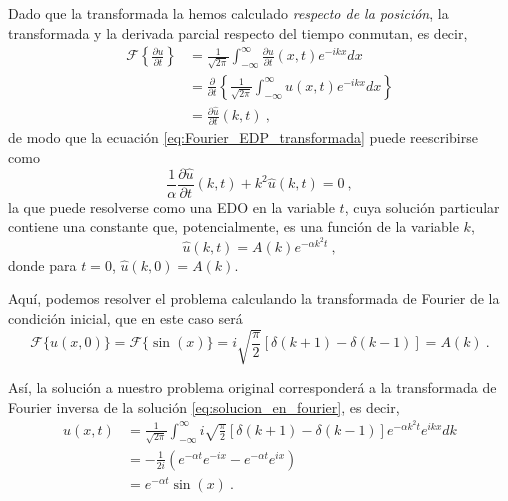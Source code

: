 \begin{ejemplo}
    Dado que la transformada la hemos calculado \emph{respecto de la posición}, la transformada y la derivada parcial respecto del tiempo conmutan, es decir,
    \begin{align}
        \mathcal{F} \left\{ \frac{\partial u}{\partial t} \right\} & = \frac{1}{\sqrt{2\pi}} \int_{-\infty}^\infty \frac{\partial u}{\partial t} (x,t) e^{-ikx} dx \nonumber \\
        & = \frac{\partial }{\partial t} \left\{ \frac{1}{\sqrt{2\pi}} \int_{-\infty}^\infty u(x,t) e^{-ikx} dx  \right\} \nonumber \\
        & = \frac{\partial \hat{u}}{\partial t}(k,t) \ ,
    \end{align}
    de modo que la ecuación \eqref{eq:Fourier_EDP_transformada} puede reescribirse como
    \begin{equation} \label{eq:EDP_fourier_reducida}
        \frac{1}{\alpha} \frac{\partial \hat{u}}{\partial t}(k,t) + k^2 \hat{u}(k,t) = 0 \ ,
    \end{equation}
    la que puede resolverse como una EDO en la variable $t$, cuya solución particular contiene una constante que, potencialmente, es una función de la variable $k$,
    \begin{equation} \label{eq:solucion_en_fourier}
        \hat{u}(k,t) = A(k) e^{-\alpha k^2 t} \ ,
    \end{equation}
    donde para $t=0$, $\hat{u}(k,0) = A(k)$.

    Aquí, podemos resolver el problema calculando la transformada de Fourier de la condición inicial, que en este caso será
    \begin{equation}
        \mathcal{F}\{u(x,0)\} =  \mathcal{F}\{\sin(x)\} = i \sqrt{\frac{\pi}{2}} [\delta(k+1) - \delta(k-1)] = A(k) \ .
    \end{equation}
    
    Así, la solución a nuestro problema original corresponderá a la transformada de Fourier inversa de la solución \eqref{eq:solucion_en_fourier}, es decir,
    \begin{align}
        u(x,t) & = \frac{1}{\sqrt{2\pi}} \int_{-\infty}^\infty i \sqrt{\frac{\pi}{2}} [\delta(k+1) - \delta(k-1)] e^{-\alpha k^2 t} e^{ikx} dk \nonumber \\
        & = - \frac{1}{2i} \left( e^{-\alpha t} e^{-ix} - e^{-\alpha t} e^{ix} \right) \nonumber \\
        & = e^{-\alpha t} \sin(x) \ . \label{eq:solucion_edp_fourier_final}
    \end{align}
\end{ejemplo}

